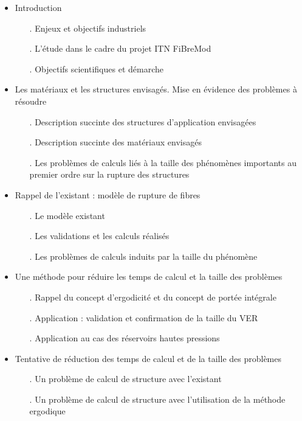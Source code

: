 \begin{itemize}
\item Introduction
\begin{itemize}
           \item[.] Enjeux et objectifs industriels
           \item[.] L'étude dans le cadre du projet ITN FiBreMod
           \item[.] Objectifs scientifiques et démarche
\end{itemize}

\item Les matériaux et les structures envisagés. Mise en évidence des problèmes à résoudre
\begin{itemize}
    \item[.]  Description succinte des structures d'application envisagées
    \item[.]  Description succinte des matériaux envisagés
    \item[.]  Les problèmes de calculs liés à la taille des phénomènes importants au premier ordre sur la rupture des structures
\end{itemize}

\item Rappel de l'existant : modèle de rupture de fibres
\begin{itemize}
    \item[.]  Le modèle existant
    \item[.]  Les validations et les calculs réalisés
    \item[.]  Les problèmes de calculs induits par la taille du phénomène
\end{itemize}

\item Une méthode pour réduire les temps de calcul et la taille des problèmes
\begin{itemize}
           \item[.] Rappel du concept d'ergodicité et du concept de portée intégrale
           \item[.] Application : validation et confirmation de la taille du VER
           \item[.] Application au cas des réservoirs hautes pressions
\end{itemize}

\item Tentative de réduction des temps de calcul et de la taille des problèmes
\begin{itemize}
    \item[.] Un problème de calcul de structure avec l'existant
    \item[.] Un problème de calcul de structure avec l'utilisation de la méthode ergodique
\end{itemize}


\end{itemize}
